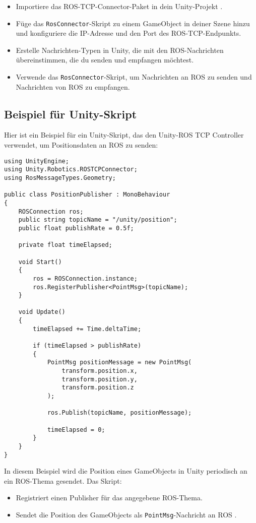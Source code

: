 \begin{itemize}
    \item Importiere das ROS-TCP-Connector-Paket in dein Unity-Projekt \cite{unity_ros_tcp_connector}.
    \item Füge das \texttt{RosConnector}-Skript zu einem GameObject in deiner Szene hinzu und konfiguriere die IP-Adresse und den Port des ROS-TCP-Endpunkts.
    \item Erstelle Nachrichten-Typen in Unity, die mit den ROS-Nachrichten übereinstimmen, die du senden und empfangen möchtest.
    \item Verwende das \texttt{RosConnector}-Skript, um Nachrichten an ROS zu senden und Nachrichten von ROS zu empfangen.
\end{itemize}

\subsection{Beispiel für Unity-Skript}

Hier ist ein Beispiel für ein Unity-Skript, das den Unity-ROS TCP Controller verwendet, um Positionsdaten an ROS zu senden:

\begin{verbatim}
using UnityEngine;
using Unity.Robotics.ROSTCPConnector;
using RosMessageTypes.Geometry;

public class PositionPublisher : MonoBehaviour
{
    ROSConnection ros;
    public string topicName = "/unity/position";
    public float publishRate = 0.5f;

    private float timeElapsed;

    void Start()
    {
        ros = ROSConnection.instance;
        ros.RegisterPublisher<PointMsg>(topicName);
    }

    void Update()
    {
        timeElapsed += Time.deltaTime;

        if (timeElapsed > publishRate)
        {
            PointMsg positionMessage = new PointMsg(
                transform.position.x,
                transform.position.y,
                transform.position.z
            );

            ros.Publish(topicName, positionMessage);

            timeElapsed = 0;
        }
    }
}
\end{verbatim}
\noindent
In diesem Beispiel wird die Position eines GameObjects in Unity periodisch an ein ROS-Thema gesendet. Das Skript:

\begin{itemize}
    \item Registriert einen Publisher für das angegebene ROS-Thema.
    \item Sendet die Position des GameObjects als \texttt{PointMsg}-Nachricht an ROS \cite{unity_ros_tcp_connector}.
\end{itemize}

